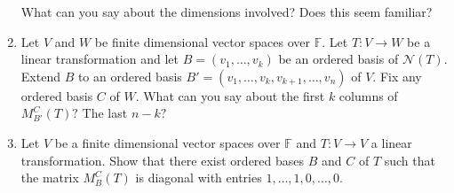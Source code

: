 \documentclass[12pt]{article}
\begin{document}
\begin{enumerate}[leftmargin=*]
	What can you say about the dimensions involved? Does this seem familiar?
	\item Let $V$ and $W$ be finite dimensional vector spaces over $\mathbb{F}.$ Let $T : V \to W$ be a linear transformation and let $B = (v_1, \ldots, v_k)$ be an ordered basis of $\mathcal{N}(T).$ Extend $B$ to an ordered basis $B' = (v_1, \ldots, v_k, v_{k + 1}, \ldots, v_n)$ of $V.$ Fix any ordered basis $C$ of $W.$ What can you say about the first $k$ columns of $M_{B'}^C(T)?$ The last $n - k?$
	\item Let $V$ be a finite  dimensional vector spaces over $\mathbb{F}$ and $T : V \to V$ a linear transformation. Show that there exist ordered bases $B$ and $C$ of $T$ such that the matrix $M_B^C(T)$ is diagonal with entries $1, \ldots, 1, 0, \ldots, 0.$
\end{enumerate}
\end{document}
